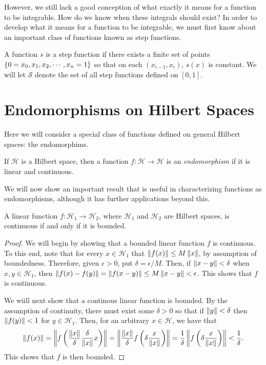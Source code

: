 However, we still lack a good conception of what exactly it means for a function to be integrable. How
do we know when these integrals should exist? In order to develop what it means for a function to be
integrable, we must first know about an important class of functions known as step functions.
\begin{definition}
    A function $s$ is a step function if there exists a finite set of points $\left\{ 0 = x_0, x_1, x_2,
    \cdots, x_n = 1 \right\}$ so that on each $(x_{i-1}, x_i)$, $s(x)$ is constant. We will let $\mathcal{S}$
    denote the set of all step functions defined on $[0,1]$.
\end{definition}



\section{Endomorphisms on Hilbert Spaces}
Here we will consider a special class of functions defined on general Hilbert spaces: the endomorphims.
\begin{definition}
    If $\mathcal{H}$ is a Hilbert space, then a function $f: \mathcal{H} \to \mathcal{H}$ is an
    \emph{endomorphism} if it is linear and continuous.
\end{definition}
We will now show an important result that is useful in characterizing functions as endomorphisms,
although it has further applications beyond this.
\begin{proposition}
    A linear function $f: \mathcal{H}_1 \to \mathcal{H}_2$, where $\mathcal{H}_1$ and $\mathcal{H}_2$ are
    Hilbert spaces, is continuous if and only if it is bounded.
\end{proposition}
\begin{proof}
    We will begin by showing that a bounded linear function $f$ is continuous. To this end, note that
    for every $x \in \mathcal{H}_1$ that $\left\| f(x) \right\| \leq M\left\| x \right\|$, by assumption of boundedness.
    Therefore, given $\epsilon > 0$, put $\delta = \epsilon / M$. Then, if $\left\| x-y \right\| < \delta$ when
    $x, y \in \mathcal{H}_1$, then $\left\| f(x) - f(y) \right\| = \left\| f(x-y) \right\| \leq M\left\| x-y \right\| < \epsilon$.
    This shows that $f$ is continuous.

    We wiill next show that a continous linear function is bounded. By the assumption of continuity,
    there must exist some $\delta > 0$ so that if $\left\| y \right\| < \delta$ then $\left\| f(y) \right\| < 1$ for $y \in
    \mathcal{H}_1$. Then, for an arbitrary $x \in \mathcal{H}$, we have that
    \[
        \left\| f(x) \right\| = \left\| f\left( \frac{\left\| x \right\|}{\delta} \frac{\delta}{\left\| x \right\|} x \right) \right\| =
        \left\| \frac{\left\| x \right\|}{\delta} f\left( \delta \frac{x}{\left\| x \right\|} \right) \right\| = \frac{1}{\delta}
        \left\| f\left(\delta \frac{x}{\left\| x \right\|}\right) \right\| < \frac{1}{\delta}.
    \]
    This shows that $f$ is then bounded.
\end{proof}

